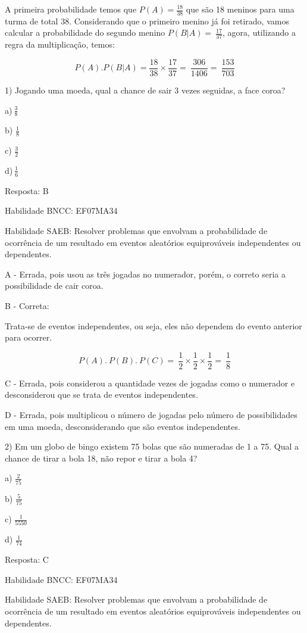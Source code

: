 {A primeira probabilidade temos que \(P(A) = \frac{18}{38}\) que são 18
meninos para uma turma de total 38. Considerando que o primeiro menino
já foi retirado, vamos calcular a probabilidade do segundo menino
\(P(B|A) = \ \frac{17}{37}\), agora, utilizando a regra da
multiplicação, temos:

\[P(A).P(B|A) = \frac{18}{38} \times \frac{17}{37} = \ \frac{306}{1406} = \ \frac{153}{703}\]


1) Jogando uma moeda, qual a chance de sair 3 vezes seguidas, a face
coroa?

a)\(\ \frac{3}{8}\)

b) \(\frac{1}{8}\)

c) \(\frac{3}{2}\)

d)\(\ \frac{1}{6}\)

Resposta: B

Habilidade BNCC: EF07MA34

Habilidade SAEB: Resolver problemas que envolvam a probabilidade de
ocorrência de um resultado em eventos aleatórios equiprováveis
independentes ou dependentes.

A - Errada, pois usou as três jogadas no numerador, porém, o correto
seria a possibilidade de cair coroa.

B - Correta:

Trata-se de eventos independentes, ou seja, eles não dependem do evento
anterior para ocorrer.

\[P(A).\ P(B).\ P(C) = \ \frac{1}{2} \times \frac{1}{2} \times \frac{1}{2} = \ \frac{1}{8}\]

C - Errada, pois considerou a quantidade vezes de jogadas como o
numerador e desconsiderou que se trata de eventos independentes.

D - Errada, pois multiplicou o número de jogadas pelo número de
possibilidades em uma moeda, desconsiderando que são eventos
independentes.

2) Em um globo de bingo existem 75 bolas que são numeradas de 1 a 75.
Qual a chance de tirar a bola 18, não repor e tirar a bola 4?

a) \(\frac{2}{75}\)

b) \(\frac{5}{75}\)

c) \(\frac{1}{5550}\)

d) \(\frac{1}{74}\)

Resposta: C

Habilidade BNCC: EF07MA34

Habilidade SAEB: Resolver problemas que envolvam a probabilidade de
ocorrência de um resultado em eventos aleatórios equiprováveis
independentes ou dependentes.

}
